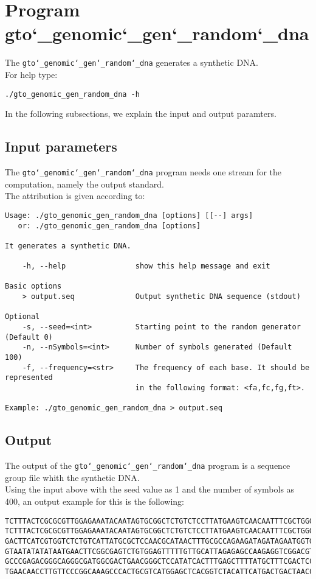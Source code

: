 \section{Program gto\char`_genomic\char`_gen\char`_random\char`_dna}
The \texttt{gto\char`_genomic\char`_gen\char`_random\char`_dna} generates a synthetic DNA.\\
For help type:
\begin{lstlisting}
./gto_genomic_gen_random_dna -h
\end{lstlisting}
In the following subsections, we explain the input and output paramters.

\subsection*{Input parameters}

The \texttt{gto\char`_genomic\char`_gen\char`_random\char`_dna} program needs one stream for the computation,
namely the output standard.\\
The attribution is given according to:
\begin{lstlisting}
Usage: ./gto_genomic_gen_random_dna [options] [[--] args]
   or: ./gto_genomic_gen_random_dna [options]

It generates a synthetic DNA.

    -h, --help                show this help message and exit

Basic options
    > output.seq              Output synthetic DNA sequence (stdout)

Optional
    -s, --seed=<int>          Starting point to the random generator (Default 0)
    -n, --nSymbols=<int>      Number of symbols generated (Default 100)
    -f, --frequency=<str>     The frequency of each base. It should be represented 
    						  in the following format: <fa,fc,fg,ft>.

Example: ./gto_genomic_gen_random_dna > output.seq
\end{lstlisting}

\subsection*{Output}
The output of the \texttt{gto\char`_genomic\char`_gen\char`_random\char`_dna} program is a sequence group file whith the synthetic DNA.\\
Using the input above with the seed value as 1 and the number of symbols as 400, an output example for this is the following:
\begin{lstlisting}
TCTTTACTCGCGCGTTGGAGAAATACAATAGTGCGGCTCTGTCTCCTTATGAAGTCAACAATTTCGCTGGGACTTGCGGC
TCTTTACTCGCGCGTTGGAGAAATACAATAGTGCGGCTCTGTCTCCTTATGAAGTCAACAATTTCGCTGGGACTTGCGGC
GACTTCATCGTGGTCTCTGTCATTATGCGCTCCAACGCATAACTTTGCGCCAGAAGATAGATAGAATGGTGTAAGAAACT
GTAATATATATAATGAACTTCGGCGAGTCTGTGGAGTTTTTGTTGCATTAGAGAGCCAAGAGGTCGGACGTCCTCACGTA
GCCCGAGACGGGCAGGGCGATGGCGACTGAACGGGCTCCATATCACTTTGAGCTTTTATGCTTTCGACTCCTCCAGGAGC
TGAACAACCTTGTTCCCGGCAAAGCCCACTGCGTCATGGAGCTCACGGTCTACATTCATGACTGACTAACCGTAAACTGC
\end{lstlisting}
